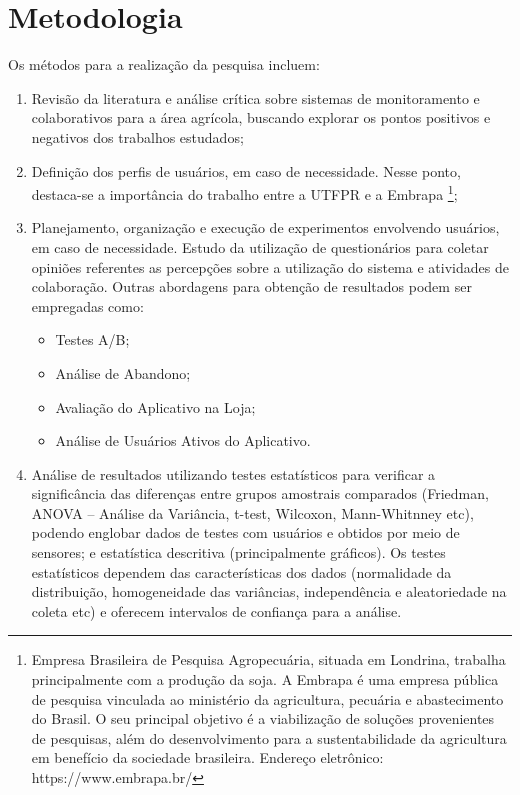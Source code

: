 \documentclass[12pt]{article}
\begin{document}
\section{Metodologia}
\label{sec:metodologia}

Os métodos para a realização da pesquisa incluem:

\begin{enumerate}
	\item Revisão da literatura e análise crítica sobre sistemas de monitoramento e colaborativos para a área agrícola, buscando explorar os pontos positivos e negativos dos trabalhos estudados;
	\item Definição dos perfis de usuários, em caso de necessidade. Nesse ponto, destaca-se a importância do trabalho entre a UTFPR e a Embrapa \footnote{Empresa Brasileira de Pesquisa Agropecuária, situada em Londrina, trabalha principalmente com a produção da soja. A Embrapa é uma empresa pública de pesquisa vinculada ao ministério da agricultura, pecuária e abastecimento do Brasil. O seu principal objetivo é a viabilização de soluções provenientes de pesquisas, além do desenvolvimento para a sustentabilidade da agricultura em benefício da sociedade brasileira. Endereço eletrônico: https://www.embrapa.br/};
	\item Planejamento, organização e execução de experimentos envolvendo usuários, em caso de necessidade. Estudo da utilização de questionários para coletar opiniões referentes as percepções sobre a utilização do sistema e atividades de colaboração. Outras abordagens para obtenção de resultados podem ser empregadas como:
	\begin{itemize}
		\item Testes A/B;
		\item Análise de Abandono;
		\item Avaliação do Aplicativo na Loja;
		\item Análise de Usuários Ativos do Aplicativo.
	\end{itemize}
	\item Análise de resultados utilizando testes estatísticos para verificar a significância das diferenças entre grupos amostrais comparados (Friedman, ANOVA – Análise da Variância, t-test, Wilcoxon, Mann-Whitnney etc), podendo englobar dados de testes com usuários e obtidos por meio de sensores; e estatística descritiva (principalmente gráficos). Os testes estatísticos dependem das características dos dados (normalidade da distribuição, homogeneidade das variâncias, independência e aleatoriedade na coleta etc) e oferecem intervalos de confiança para a análise.
\end{enumerate}
\end{document}
